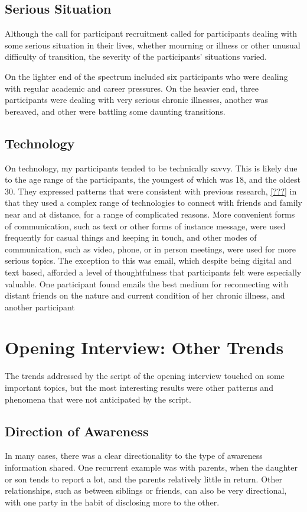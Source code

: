   \subsection{Serious Situation}
  Although the call for participant recruitment called for participants
  dealing with some serious situation in their lives,
  whether mourning or illness or other unusual difficulty of transition,
  the severity of the participants' situations varied.

  On the lighter end of the spectrum included six participants who were
  dealing with regular academic and career pressures.
  On the heavier end,
  three participants were dealing with very serious chronic illnesses,
  another was bereaved, and other were battling some daunting transitions.

  \subsection{Technology}
  On technology,
  my participants tended to be technically savvy.
  This is likely due to the age range of the participants,
  the youngest of which was 18, and the oldest 30.
  They expressed patterns that were consistent with previous research,
  \ref{???}
  in that they used a complex range of technologies to connect
  with friends and family near and at distance,
  for a range of complicated reasons.
  More convenient forms of communication,
  such as text or other forms of instance message,
  were used frequently for casual things and keeping in touch,
  and other modes of communication, such as video, phone, or in person meetings,
  were used for more serious topics.
  The exception to this was email,
  which despite being digital and text based, 
  afforded a level of thoughtfulness that participants
  felt were especially valuable.
  One participant found emails the best medium for reconnecting
  with distant friends on the nature and current condition of her
  chronic illness,
  and another participant

\section{Opening Interview: Other Trends}
  The trends addressed by the script of the opening interview touched on
  some important topics, but the most interesting results
  were other patterns and phenomena
  that were not anticipated by the script.

  \subsection{Direction of Awareness}
  In many cases, there was a clear directionality to the type of awareness
  information shared.
  One recurrent example was with parents,
  when the daughter or son tends to report a lot,
  and the parents relatively little in return.
  Other relationships, such as between siblings or friends,
  can also be very directional,
  with one party in the habit of disclosing more to the other.

